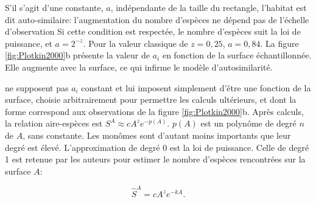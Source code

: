 \documentclass[
  11pt,
  french,
  a4paper,
  extrafontsizes,onecolumn,openright
  ]{memoir}
\newlength{\rf}
\begin{document}
\normalsize

S'il s'agit d'une constante, \(a\), indépendante de la taille du rectangle, l'habitat est dit auto-similaire: l'augmentation du nombre d'espèces ne dépend pas de l'échelle d'observation Si cette condition est respectée, le nombre d'espèces suit la loi de puissance, et \(a=2^{-z}\).
Pour la valeur classique de \(z=0,25\), \(a=0,84\).
La figure \ref{fig:Plotkin2000}b \autocite{Plotkin2000} présente la valeur de \(a_i\) en fonction de la surface échantillonnée.
Elle augmente avec la surface, ce qui infirme le modèle d'autosimilarité.

\textcite{Plotkin2000} ne supposent pas \(a_i\) constant et lui imposent simplement d'être une fonction de la surface, choisie arbitrairement pour permettre les calculs ultérieurs, et dont la forme correspond aux observations de la figure \ref{fig:Plotkin2000}b.
Après calculs, la relation aire-espèces est \(S^{A}\approx cA^z e^{-p\left(A\right)}\).
\(p(A)\) est un polynôme de degré \(n\) de \(A\), sans constante.
Les monômes sont d'autant moins importants que leur degré est élevé.
L'approximation de degré 0 est la loi de puissance.
Celle de degré 1 est retenue par les auteurs pour estimer le nombre d'espèces rencontrées sur la surface \(A\):

\begin{equation}
  \label{eq:Plotkin2000}
  \hat{S}^{A} = cA^z e^{-kA}.
\end{equation}



\scriptsize
\end{document}
